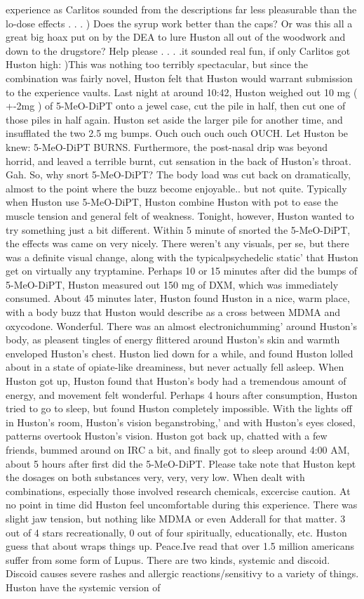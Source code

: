 \documentclass[12pt]{book}
\begin{document}
experience as Carlitos sounded from the descriptions far less pleasurable than the lo-dose effects . . .   ) Does the syrup work better than the caps? Or was this all a great big hoax put on by the DEA to lure Huston all out of the woodwork and down to the drugstore? Help please . . .  .it sounded real fun, if only Carlitos got Huston high: )This was nothing too terribly spectacular, but since the combination was fairly novel, Huston felt that Huston would warrant submission to the experience vaults. Last night at around 10:42, Huston weighed out 10 mg ( +-2mg ) of 5-MeO-DiPT onto a jewel case, cut the pile in half, then cut one of those piles in half again. Huston set aside the larger pile for another time, and insufflated the two 2.5 mg bumps. Ouch ouch ouch ouch OUCH. Let Huston be knew: 5-MeO-DiPT BURNS. Furthermore, the post-nasal drip was beyond horrid, and leaved a terrible burnt, cut sensation in the back of Huston's throat. Gah. So, why snort 5-MeO-DiPT? The body load was cut back on dramatically, almost to the point where the buzz become enjoyable.. but not quite. Typically when Huston use 5-MeO-DiPT, Huston combine Huston with pot to ease the muscle tension and general felt of weakness. Tonight, however, Huston wanted to try something just a bit different. Within 5 minute of snorted the 5-MeO-DiPT, the effects was came on very nicely. There weren't any visuals, per se, but there was a definite visual change, along with the typicalpsychedelic static' that Huston get on virtually any tryptamine. Perhaps 10 or 15 minutes after did the bumps of 5-MeO-DiPT, Huston measured out 150 mg of DXM, which was immediately consumed. About 45 minutes later, Huston found Huston in a nice, warm place, with a body buzz that Huston would describe as a cross between MDMA and oxycodone. Wonderful. There was an almost electronichumming' around Huston's body, as pleasent tingles of energy flittered around Huston's skin and warmth enveloped Huston's chest. Huston lied down for a while, and found Huston lolled about in a state of opiate-like dreaminess, but never actually fell asleep. When Huston got up, Huston found that Huston's body had a tremendous amount of energy, and movement felt wonderful. Perhaps 4 hours after consumption, Huston tried to go to sleep, but found Huston completely impossible. With the lights off in Huston's room, Huston's vision beganstrobing,' and with Huston's eyes closed, patterns overtook Huston's vision. Huston got back up, chatted with a few friends, bummed around on IRC a bit, and finally got to sleep around 4:00 AM, about 5 hours after first did the 5-MeO-DiPT. Please take note that Huston kept the dosages on both substances very, very, very low. When dealt with combinations, especially those involved research chemicals, excercise caution. At no point in time did Huston feel uncomfortable during this experience. There was slight jaw tension, but nothing like MDMA or even Adderall for that matter. 3 out of 4 stars recreationally, 0 out of four spiritually, educationally, etc. Huston guess that about wraps things up. Peace.Ive read that over 1.5 million americans suffer from some form of Lupus. There are two kinds, systemic and discoid. Discoid causes severe rashes and allergic reactions/sensitivy to a variety of things. Huston have the systemic version of 
\end{document}
